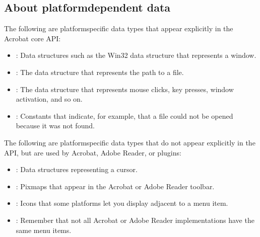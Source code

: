 \documentclass[letterpaper,12pt,english,openany,oneside]{sphinxmanual}
\begin{document}
\subsection{About platform\sphinxhyphen{}dependent data}
\label{\detokenize{Plugins_CreatingSimplePlug:about-platform-dependent-data}}
The following are platform\sphinxhyphen{}specific data types that appear explicitly in the Acrobat core API:
\begin{itemize}
\item {} 
: Data structures such as the Win32 data structure that represents a window.

\item {} 
: The data structure that represents the path to a file.

\item {} 
: The data structure that represents mouse clicks, key presses, window activation, and so on.

\item {} 
: Constants that indicate, for example, that a file could not be opened because it was not found.

\end{itemize}

The following are platform\sphinxhyphen{}specific data types that do not appear explicitly in the API, but are used by Acrobat, Adobe Reader, or plugins:
\begin{itemize}
\item {} 
: Data structures representing a cursor.

\item {} 
: Pixmaps that appear in the Acrobat or Adobe Reader toolbar.

\item {} 
: Icons that some platforms let you display adjacent to a menu item.

\item {} 
: Remember that not all Acrobat or Adobe Reader implementations have the same menu items.

\end{itemize}
\end{document}
